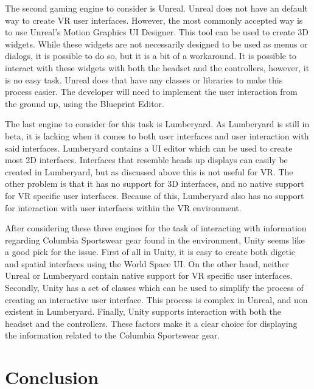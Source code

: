 \documentclass[10pt,journal,compsoc,onecolumn, draftclsnofoot]{IEEEtran}
\begin{document}
The second gaming engine to consider is Unreal.
Unreal does not have an default way to create VR user interfaces.
However, the most commonly accepted way is to use Unreal's Motion Graphics UI Designer.
This tool can be used to create 3D widgets.
While these widgets are not necessarily designed to be used as menus or dialogs, it is possible to do so, but it is a bit of a workaround.
It is possible to interact with these widgets with both the headset and the controllers, however, it is no easy task.
Unreal does that have any classes or libraries to make this process easier.
The developer will need to implement the user interaction from the ground up, using the Blueprint Editor.

The last engine to consider for this task is Lumberyard.
As Lumberyard is still in beta, it is lacking when it comes to both user interfaces and user interaction with said interfaces.
Lumberyard contains a UI editor which can be used to create most 2D interfaces.
Interfaces that resemble heads up displays can easily be created in Lumberyard, but as discussed above this is not useful for VR.
The other problem is that it has no support for 3D interfaces, and no native support for VR specific user interfaces.
Because of this, Lumberyard also has no support for interaction with user interfaces within the VR environment.

After considering these three engines for the task of interacting with information regarding Columbia Sportswear gear found in the environment, Unity seems like a good pick for the issue. 
First of all in Unity, it is easy to create both digetic and spatial interfaces using the World Space UI.
On the other hand, neither Unreal or Lumberyard contain native support for VR specific user interfaces.
Secondly, Unity has a set of classes which can be used to simplify the process of creating an interactive user interface.
This process is complex in Unreal, and non existent in Lumberyard.
Finally, Unity supports interaction with both the headset and the controllers.
These factors make it a clear choice for displaying the information related to the Columbia Sportswear gear.

\section{Conclusion}



\end{document}

